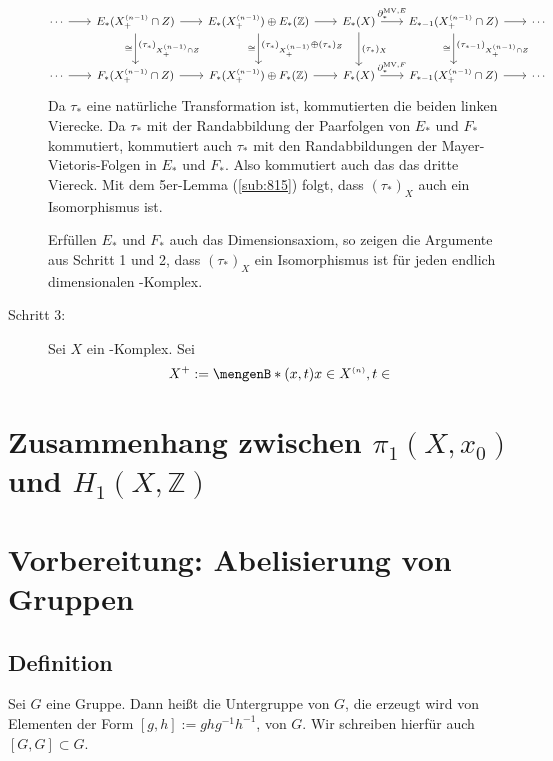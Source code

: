 \begin{description}
	\[
		\!\!\begin{tikzcd}[column sep=1.8em, row sep=2.5em,font=\small]
			\cdots \rar & E_* \enbrace{X_+^\ssbrace{n-1} \cap Z} \rar \dar["(\tau_*)_{X_+^\ssbrace{n-1} \cap Z}","\cong"']
			& E_*\enbrace{X_+^\ssbrace{n-1}} \oplus E_*(\mathds{Z}) \rar \dar["(\tau_*)_{X_+^\ssbrace{n-1}} \oplus (\tau_*)_{Z}","\cong"']
			& E_*(X) \rar["\partial_*^{\mathrm{MV},E}"] \dar["(\tau_*)_X"]
			& E_{*-1} \enbrace{X_+^\ssbrace{n-1} \cap Z} \rar \dar["(\tau_{*-1})_{X_+^\ssbrace{n-1} \cap Z}", "\cong"'] & \cdots  \\
			\cdots \rar & F_* \enbrace{X_+^\ssbrace{n-1} \cap Z} \rar & F_*\enbrace{X_+^\ssbrace{n-1}} \oplus F_*(\mathds{Z}) \rar 
			& F_*(X) \rar["\partial_*^{\mathrm{MV},F}"] & F_{*-1} \enbrace{X_+^\ssbrace{n-1} \cap Z} \rar & \cdots
		\end{tikzcd}
	\]
	Da $\tau_*$ eine natürliche Transformation ist, kommutierten die beiden linken Vierecke. Da $\tau_*$ mit der Randabbildung der Paarfolgen von $E_*$ und $F_*$ 
	kommutiert, kommutiert auch $\tau_*$ mit den Randabbildungen der Mayer-Vietoris-Folgen in $E_*$ und $F_*$. Also kommutiert auch das das dritte Viereck. Mit dem 
	5er-Lemma (\ref*{sub:815}) folgt, dass $(\tau_*)_X$ auch ein Isomorphismus ist.
	
	Erfüllen $E_*$ und $F_*$ auch das Dimensionsaxiom, so zeigen die Argumente aus Schritt 1 und 2, dass $(\tau_*)_X$ ein Isomorphismus ist für jeden endlich dimensionalen
	\CW-Komplex.
	\item[Schritt 3:] Sei $X$ ein \CW-Komplex. Sei 
	\[
		X^+ := \set[(x,t)]{x \in X^\ssbrace{n}, t \in } 
	\]
\end{description}
\newpage
\section{Zusammenhang zwischen $\pi_1(X,x_0)$ und $H_1(X,\mathds{Z})$} %
\label{sec:15}

\section*{Vorbereitung: Abelisierung von Gruppen} %

\subsection{Definition} %
\label{sub:151}
Sei $G$ eine Gruppe. Dann heißt die Untergruppe von $G$, die erzeugt wird von Elementen der Form $[g,h]:= g h g^{-1} h ^{-1}$,  von $G$. Wir schreiben
hierfür auch $[G,G] \subset G$.

